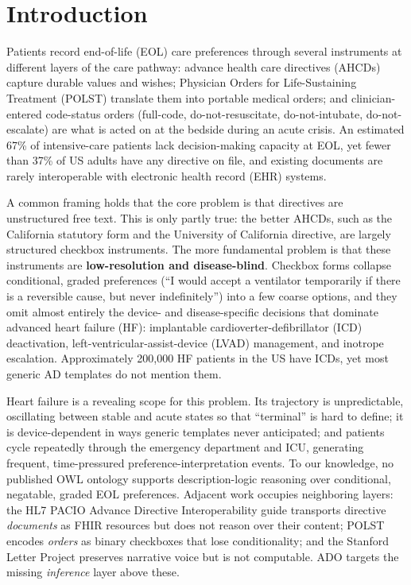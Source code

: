 \documentclass[10pt]{article}
\begin{document}
\section{Introduction}
Patients record end-of-life (EOL) care preferences through several instruments at different layers of the care pathway: advance health care directives (AHCDs) capture durable values and wishes; Physician Orders for Life-Sustaining Treatment (POLST) translate them into portable medical orders; and clinician-entered code-status orders (full-code, do-not-resuscitate, do-not-intubate, do-not-escalate) are what is acted on at the bedside during an acute crisis. An estimated 67\% of intensive-care patients lack decision-making capacity at EOL,\cite{silveira2010} yet fewer than 37\% of US adults have any directive on file,\cite{yadav2017} and existing documents are rarely interoperable with electronic health record (EHR) systems.\cite{hl7adi2024}

A common framing holds that the core problem is that directives are unstructured free text. This is only partly true: the better AHCDs, such as the California statutory form and the University of California directive, are largely structured checkbox instruments. The more fundamental problem is that these instruments are \textbf{low-resolution and disease-blind}. Checkbox forms collapse conditional, graded preferences (``I would accept a ventilator temporarily if there is a reversible cause, but never indefinitely'') into a few coarse options, and they omit almost entirely the device- and disease-specific decisions that dominate advanced heart failure (HF): implantable cardioverter-defibrillator (ICD) deactivation, left-ventricular-assist-device (LVAD) management, and inotrope escalation. Approximately 200,000 HF patients in the US have ICDs,\cite{kremers2023} yet most generic AD templates do not mention them.

Heart failure is a revealing scope for this problem. Its trajectory is unpredictable, oscillating between stable and acute states so that ``terminal'' is hard to define; it is device-dependent in ways generic templates never anticipated; and patients cycle repeatedly through the emergency department and ICU, generating frequent, time-pressured preference-interpretation events.\cite{allen2012} To our knowledge, no published OWL ontology supports description-logic reasoning over conditional, negatable, graded EOL preferences. Adjacent work occupies neighboring layers: the HL7 PACIO Advance Directive Interoperability guide\cite{hl7adi2024} transports directive \emph{documents} as FHIR resources but does not reason over their content; POLST encodes \emph{orders} as binary checkboxes that lose conditionality; and the Stanford Letter Project\cite{periyakoil} preserves narrative voice but is not computable. ADO targets the missing \emph{inference} layer above these.
\end{document}
